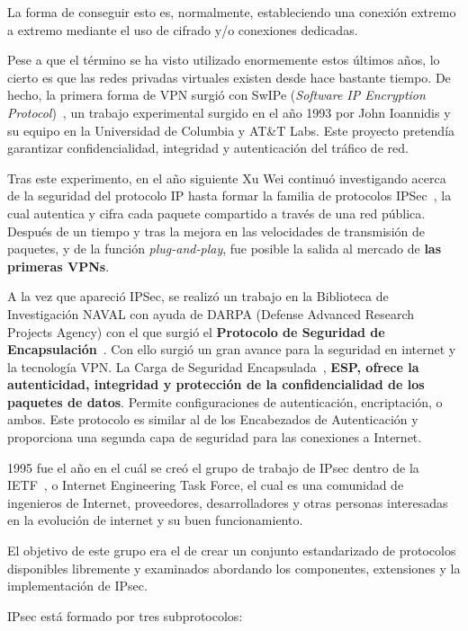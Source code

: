 La forma de conseguir esto es, normalmente, estableciendo una conexión extremo a extremo mediante el uso de cifrado y/o conexiones dedicadas.

Pese a que el término se ha visto utilizado enormemente estos últimos años, lo cierto es que las redes privadas virtuales existen desde hace bastante tiempo.
De hecho, la primera forma de VPN surgió con SwIPe (\textit{Software IP Encryption Protocol})~\cite{article:swipe}, un trabajo experimental surgido en el año 1993 por John Ioannidis y su equipo en la Universidad de Columbia y AT\&T Labs. Este proyecto pretendía garantizar confidencialidad, integridad y autenticación del tráfico de red.

Tras este experimento, en el año siguiente Xu Wei continuó investigando acerca de la seguridad del protocolo IP hasta formar la familia de protocolos IPSec~\cite{article:ipsec}, la cual autentica y cifra cada paquete compartido a través de una red pública. Después de un tiempo y tras la mejora en las velocidades de transmisión de paquetes, y de la función \textit{plug-and-play}, fue posible la salida al mercado de \textbf{las primeras VPNs}.

A la vez que apareció IPSec, se  realizó un trabajo en la Biblioteca de Investigación NAVAL con ayuda de DARPA (Defense Advanced Research Projects Agency) con el que surgió el \textbf{Protocolo de Seguridad de Encapsulación}~\cite{article:levpn}. 
Con ello surgió un gran avance para la seguridad en internet y la tecnología VPN. 
La Carga de Seguridad Encapsulada~\cite{article:esp}, \textbf{ESP, ofrece la autenticidad, integridad y protección de la confidencialidad de los paquetes de datos}. 
Permite configuraciones de autenticación, encriptación, o ambos. 
Este protocolo es similar al de los Encabezados de Autenticación y proporciona una segunda capa de seguridad para las conexiones a Internet. 

1995 fue el año en el cuál se creó el grupo de trabajo de IPsec dentro de la IETF~\cite{article:ietf}, o Internet Engineering Task Force, el cual es una comunidad de ingenieros de Internet, proveedores, desarrolladores y otras personas interesadas en la evolución de internet y su buen funcionamiento. 

El objetivo de este grupo era el de crear un conjunto estandarizado de protocolos disponibles libremente y examinados abordando los componentes, extensiones y la implementación de IPsec.

IPsec está formado por tres subprotocolos:

